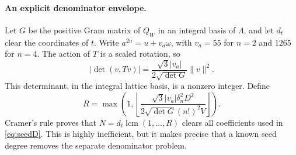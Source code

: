 \documentclass[11pt,a4paper]{article}
\theoremstyle{definition}\newtheorem{definition}[theorem]{Definition}
\theoremstyle{remark}\newtheorem{remark}[theorem]{Remark}
\begin{document}
\paragraph{An explicit denominator envelope.}
Let $G$ be the positive Gram matrix of $Q_W$ in an integral basis of $\Lambda$, and let $d_t$ clear the coordinates of $t$. Write $a^{2n}=u+v_a\omega$, with $v_a=55$ for $n=2$ and $1265$ for $n=4$. The action of $T$ is a scaled rotation, so
\[
 |\det(v,Tv)|=\frac{\sqrt3|v_a|}{2\sqrt{\det G}}\|v\|^2.
\]
This determinant, in the integral lattice basis, is a nonzero integer. Define
\[
 R=\max\left(1,\left\lfloor
 \frac{\sqrt3|v_a|\delta_n^2D^2}{2\sqrt{\det G}(n!)^2V}
 \right\rfloor\right).
\]
Cramer's rule proves that $N=d_t\operatorname{lcm}(1,\ldots,R)$ clears all coefficients used in \eqref{eq:seedD}. This is highly inefficient, but it makes precise that a known seed degree removes the separate denominator problem.




\end{document}
